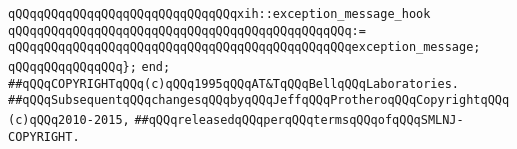 \verb|qQQqqQQqqQQqqQQqqQQqqQQqqQQqqQQqxih::exception_message_hook|\newline
\verb|qQQqqQQqqQQqqQQqqQQqqQQqqQQqqQQqqQQqqQQqqQQqqQQq:=|\newline
\verb|qQQqqQQqqQQqqQQqqQQqqQQqqQQqqQQqqQQqqQQqqQQqqQQqexception_message;|\newline
\verb|qQQqqQQqqQQqqQQq};|\newline
\verb|end;|\newline
\newline
\newline
\newline
\verb|##qQQqCOPYRIGHTqQQq(c)qQQq1995qQQqAT&TqQQqBellqQQqLaboratories.|\newline
\verb|##qQQqSubsequentqQQqchangesqQQqbyqQQqJeffqQQqProtheroqQQqCopyrightqQQq(c)qQQq2010-2015,|\newline
\verb|##qQQqreleasedqQQqperqQQqtermsqQQqofqQQqSMLNJ-COPYRIGHT.|\newline

